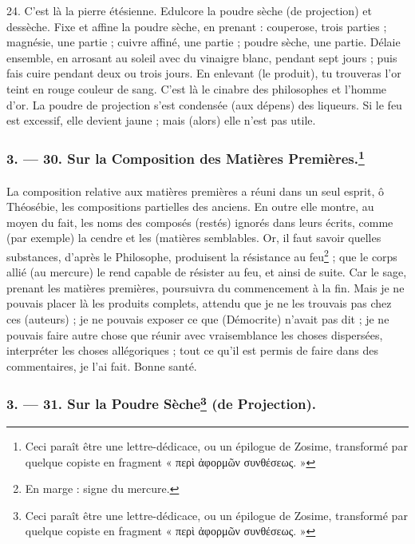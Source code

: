 \documentclass[a4paper, 11pt, oneside, polutonikogreek, french]{article}
\begin{document}
24. C'est là la pierre étésienne. Edulcore la poudre sèche (de projection) et dessèche. Fixe et affine la poudre sèche, en prenant : couperose, trois parties ; magnésie, une partie ; cuivre affiné, une partie ; poudre sèche, une partie. Délaie ensemble, en arrosant au soleil avec du vinaigre blanc, pendant sept jours ; puis fais cuire pendant deux ou trois jours. En enlevant (le produit), tu trouveras l'or teint en rouge couleur de sang. C'est là le cinabre des philosophes et l'homme d'or. La poudre de projection s'est condensée (aux dépens) des liqueurs. Si le feu est excessif, elle devient jaune ; mais (alors) elle n'est pas utile.

\bigskip
\centerline{\EightStarTaper}
\centerline{\EightStarTaper\EightStarTaper}
\bigskip

\subsubsection[3. --- 30. Sur la Composition des Matières Premières.]{3. --- 30. Sur la Composition des Matières Premières.\footnote{Ceci paraît être une lettre-dédicace, ou un épilogue de Zosime, transformé par quelque copiste en fragment « περὶ ἀφορμῶν συνθέσεως. »}}
\paragraph{}
La composition relative aux matières premières a réuni dans un seul esprit, ô Théosébie, les compositions partielles des anciens. En outre elle montre, au moyen du fait, les noms des composés (restés) ignorés dans leurs écrits, comme (par exemple) la cendre et les (matières semblables. Or, il faut savoir quelles substances, d'après le Philosophe, produisent la résistance au feu\footnote{En marge : signe du mercure.} ; que le corps allié (au mercure) le rend capable de résister au feu, et ainsi de suite. Car le sage, prenant les matières premières, poursuivra du commencement à la fin. Mais je ne pouvais placer là les produits complets, attendu que je ne les trouvais pas chez ces (auteurs) ; je ne pouvais exposer ce que (Démocrite) n'avait pas dit ; je ne pouvais faire autre chose que réunir avec vraisemblance les choses dispersées, interpréter les choses allégoriques ; tout ce qu'il est permis de faire dans des commentaires, je l'ai fait. Bonne santé.

\bigskip
\centerline{\EightStarTaper}
\centerline{\EightStarTaper\EightStarTaper}
\bigskip

\subsubsection[3. --- 31. Sur la Poudre Sèche (de Projection).]{3. --- 31. Sur la Poudre Sèche\footnote{Ceci paraît être une lettre-dédicace, ou un épilogue de Zosime, transformé par quelque copiste en fragment « περὶ ἀφορμῶν συνθέσεως. »} (de Projection).}
\end{document}
